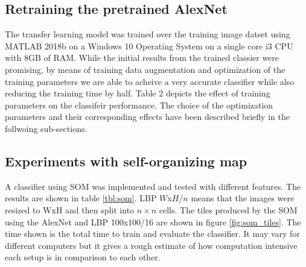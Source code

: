 \documentclass[doc/report.tex]{subfiles}
\begin{document}
\subsection{Retraining the pretrained AlexNet}
The transfer learning model was trained over the training image datset using
MATLAB 2018b on a Windows 10 Operating System on a single core i3 CPU with 8GB
of RAM. While the initial results from the trained classier were promising, by
means of training data augmentation and optimization of the training parameters
we are able to acheive a very accurate classifier while also reducing the
training time by half. Table 2 depicts the effect of training parameters on the
classifeir performance. The choice of the optimization parameters and their
corresponding effects have been described briefly in the follwoing
sub-sections.

\begin{table}[h]
\centering
\caption{Training Parameter Analysis}
\label{tab:my-table2}
\end{table}

\subsection{Experiments with self-organizing map}
A classifier using SOM was implemented and tested with different features.  The
results are shown in table \ref{tbl:som}. LBP $W$x$H$/$n$ means that the images
were resized to WxH and then split into $n\times n$ cells. The tiles produced
by the SOM using the AlexNet and LBP 100x100/16 are shown in figure
\ref{fig:som_tiles}. The time shown is the total time to train and evaluate the
classifier. It may vary for different computers but it gives a rough estimate
of how computation intensive each setup is in comparison to each other.
    
\end{document}

